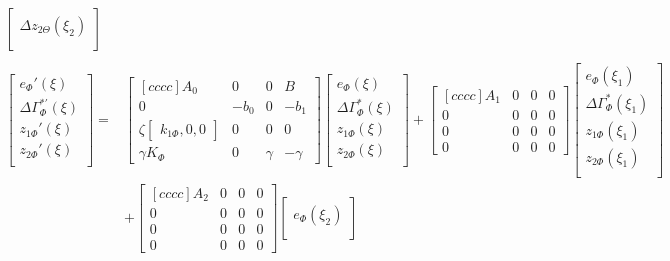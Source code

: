 \documentclass[main.tex]{subfiles}
\begin{document}
\begin{align}
\begin{bmatrix}
	\Delta z_{2\Theta}(\xi_2) \\
	\end{bmatrix} \label{eq:SynthesisConInc}\\
	\nonumber\\
	\begin{bmatrix}
	e_\Phi'(\xi) \\
	\Delta \Gamma_\Phi^{*'}(\xi) \\
	z_{1\Phi}'(\xi) \\
	z_{2\Phi}'(\xi) \\
	\end{bmatrix} =& 
	\begin{bmatrix}[cccc]
	A_0 & 0 & 0 & B\\
	0 & -b_0 & 0 & -b_1\\
	\zeta \begin{bmatrix}k_{1\Phi} , 0 , 0\end{bmatrix} & 0 & 0 & 0\\
	\gamma K_\Phi & 0 & \gamma & -\gamma
	\end{bmatrix}
	\begin{bmatrix}
	e_\Phi(\xi) \\
	\Delta \Gamma_\Phi^{*}(\xi) \\
	z_{1\Phi}(\xi) \\
	z_{2\Phi}(\xi) \\
	\end{bmatrix} + 
	\begin{bmatrix}[cccc]
	A_1 & 0 & 0 & 0\\
	0 & 0 & 0 & 0\\
	0 & 0 & 0 & 0\\
	0 & 0 & 0 & 0 
	\end{bmatrix}
	\begin{bmatrix}
	e_\Phi(\xi_1) \\
	\Delta \Gamma_\Phi^{*}(\xi_1) \\
	z_{1\Phi}(\xi_1) \\
	z_{2\Phi}(\xi_1) \\
	\end{bmatrix} \nonumber\\
	&+ 
	\begin{bmatrix}[cccc]
	A_2 & 0 & 0 & 0\\
	0 & 0 & 0 & 0\\
	0 & 0 & 0 & 0\\
	0 & 0 & 0 & 0 
	\end{bmatrix}
	\begin{bmatrix}
	e_\Phi(\xi_2) \\

\end{bmatrix}
\end{align}
\end{document}
